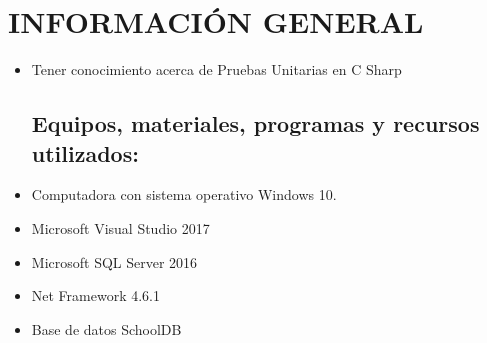 \section{INFORMACIÓN GENERAL} 

\begin{itemize}
\subsection{Objetivos:}
	\item Tener conocimiento acerca de Pruebas Unitarias en C Sharp

\subsection{Equipos, materiales, programas y recursos utilizados:}
	\item Computadora con sistema operativo Windows 10.
	\item Microsoft Visual Studio 2017
	\item Microsoft SQL Server 2016
	\item Net Framework 4.6.1
	\item Base de datos SchoolDB

\end{itemize}